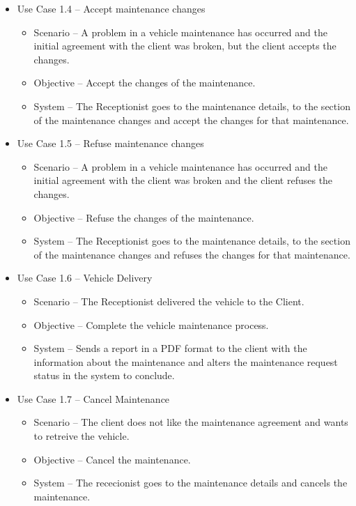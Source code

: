 \begin{itemize}
    \item Use Case 1.4 – Accept maintenance changes
    \begin{itemize}
      \item Scenario – A problem in a vehicle maintenance has occurred and the initial agreement with the client was broken, but the client accepts the changes.
      \item Objective – Accept the changes of the maintenance.
      \item System – The Receptionist goes to the maintenance details, to the section of the maintenance changes and accept the changes for that maintenance.
    \end{itemize}
    \item Use Case 1.5 – Refuse maintenance changes
    \begin{itemize}
      \item Scenario – A problem in a vehicle maintenance has occurred and the initial agreement with the client was broken and the client refuses the changes.
      \item Objective – Refuse the changes of the maintenance.
      \item System – The Receptionist goes to the maintenance details, to the section of the maintenance changes and refuses the changes for that maintenance.
    \end{itemize}
      \item Use Case 1.6 – Vehicle Delivery 
    \begin{itemize}
      \item Scenario – The Receptionist delivered the vehicle to the Client.
      \item Objective – Complete the vehicle maintenance process.
      \item System – Sends a report in a PDF format to the client with the information about the maintenance and alters the maintenance request status in the system to conclude. 
    \end{itemize}
      \item Use Case 1.7 – Cancel Maintenance 
    \begin{itemize}
      \item Scenario – The client does not like the maintenance agreement and wants to retreive the vehicle.
      \item Objective – Cancel the maintenance.
      \item System – The rececionist goes to the maintenance details and cancels the maintenance. 
    \end{itemize}

\end{itemize}
